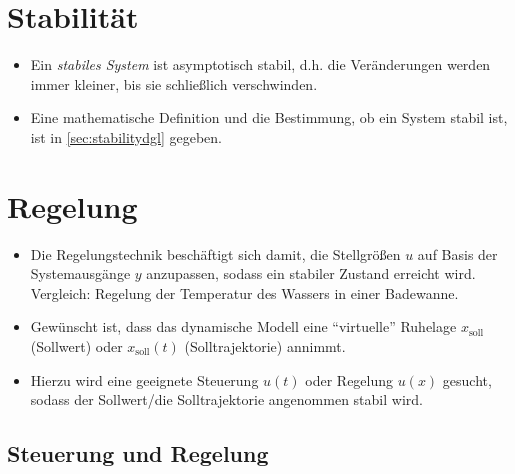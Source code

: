     \section{Stabilität} %
        \begin{itemize}
        	\item Ein \textit{stabiles System} ist asymptotisch stabil, d.h. die Veränderungen werden immer kleiner, bis sie schließlich verschwinden.
        	\item Eine mathematische Definition und die Bestimmung, ob ein System stabil ist, ist in \ref{sec:stabilitydgl} gegeben.
        \end{itemize}

    \section{Regelung} %
        \begin{itemize}
        	\item Die Regelungstechnik beschäftigt sich damit, die Stellgrößen \(u\) auf Basis der Systemausgänge \(y\) anzupassen, sodass ein stabiler Zustand erreicht wird. \\ Vergleich: Regelung der Temperatur des Wassers in einer Badewanne.
        	\item Gewünscht ist, dass das dynamische Modell eine \enquote{virtuelle} Ruhelage \(x_\text{soll}\) (Sollwert) oder \(x_\text{soll} (t)\) (Solltrajektorie) annimmt.
        	\item Hierzu wird eine geeignete Steuerung \(u(t)\) oder Regelung \(u(x)\) gesucht, sodass der Sollwert/die Solltrajektorie angenommen stabil wird.
        \end{itemize}

        \subsection{Steuerung und Regelung} %
